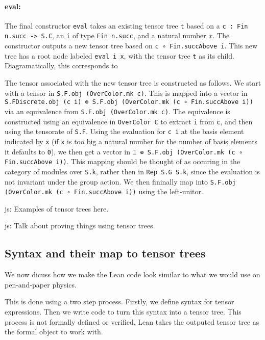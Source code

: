 \documentclass[a4paper, 11pt]{article}
\newcommand{\js}[1]{ {\color{magenta} js:  #1}}
\newcommand{\tensorTree}[1]{
\begin{center}
  \fcolorbox{mycolor}{white}{%
#1}
\end{center}
}
\begin{document}
\paragraph{eval:}
The final constructor \lstinline|eval| takes an existing tensor tree \lstinline|t| based on a \lstinline|c : Fin n.succ -> S.C|,
an \lstinline|i| of type \lstinline|Fin n.succ|, and a natural number $x$.  
The constructor outputs a new tensor tree based on \lstinline|c ∘ Fin.succAbove i|.
This new tree has a root node labeled \lstinline|eval i x|, with the tensor tree \lstinline|t| as its child.
Diagramatically, this corresponds to 
\tensorTree{
  \begin{tikzpicture}
    \node[draw=black] (A) at (0,0) {\lstinline|eval i x|};
    \node (B) at (0,-1) {\lstinline|t|};
    \draw[->] (A) -- (B);
  \end{tikzpicture} 
}
The tensor associated with the new tensor tree is constructed as follows.
We start with a tensor in \lstinline|S.F.obj (OverColor.mk c)|.
This is mapped into a vector in \lstinline|S.FDiscrete.obj (c i) ⊗ S.F.obj (OverColor.mk (c ∘ Fin.succAbove i))| via an equivalence from
\lstinline|S.F.obj (OverColor.mk c)|. The equivalence is constructed using an equivalence
in \lstinline|OverColor C| to extract \lstinline|i| from \lstinline|c|, and
then using the tensorate of \lstinline|S.F|.
Using the evaluation for \lstinline|c i| at the basis element indicated by \lstinline|x| (if \lstinline|x| is too big a natural number for the number of basis elements it defaults to \lstinline|0|), we then get a vector in
\lstinline|𝟙 ⊗ S.F.obj (OverColor.mk (c ∘ Fin.succAbove i))|.
This mapping should be thought of as occuring in the  category of modules over \lstinline|S.k|, rather then in 
\lstinline|Rep S.G S.k|, since the evaluation is not invariant under the group action.
We then fininally map  into \lstinline|S.F.obj (OverColor.mk (c ∘ Fin.succAbove i))| 
using the left-unitor.


\js{Examples of tensor trees here.}

\js{Talk about proving things using tensor trees. }
\subsection{Syntax and their map to tensor trees}


We now dicuss how we make the Lean code look similar to what we would use on pen-and-paper physics. 

This is done using a two step process. Firstly, we define syntax for tensor expressions. 
Then we write code to turn this syntax into a tensor tree. This process is not formally defined or 
verified, Lean takes the outputed tensor tree as the formal object to work with.
\end{document}
